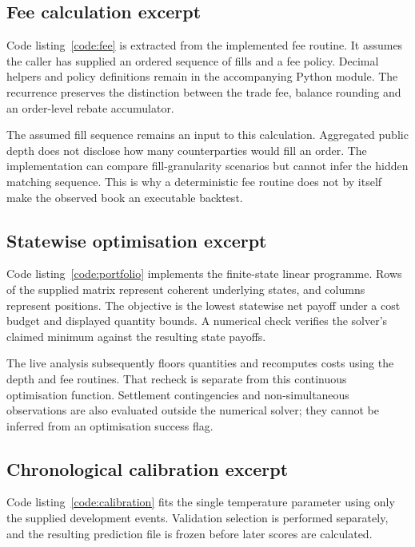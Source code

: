 \subsection{Fee calculation excerpt}
Code listing~\ref{code:fee} is extracted from the implemented fee routine. It assumes the caller has supplied an ordered sequence of fills and a fee policy. Decimal helpers and policy definitions remain in the accompanying Python module. The recurrence preserves the distinction between the trade fee, balance rounding and an order-level rebate accumulator.



The assumed fill sequence remains an input to this calculation. Aggregated public depth does not disclose how many counterparties would fill an order. The implementation can compare fill-granularity scenarios but cannot infer the hidden matching sequence. This is why a deterministic fee routine does not by itself make the observed book an executable backtest.

\subsection{Statewise optimisation excerpt}
Code listing~\ref{code:portfolio} implements the finite-state linear programme. Rows of the supplied matrix represent coherent underlying states, and columns represent positions. The objective is the lowest statewise net payoff under a cost budget and displayed quantity bounds. A numerical check verifies the solver's claimed minimum against the resulting state payoffs.



The live analysis subsequently floors quantities and recomputes costs using the depth and fee routines. That recheck is separate from this continuous optimisation function. Settlement contingencies and non-simultaneous observations are also evaluated outside the numerical solver; they cannot be inferred from an optimisation success flag.

\subsection{Chronological calibration excerpt}
Code listing~\ref{code:calibration} fits the single temperature parameter using only the supplied development events. Validation selection is performed separately, and the resulting prediction file is frozen before later scores are calculated.

